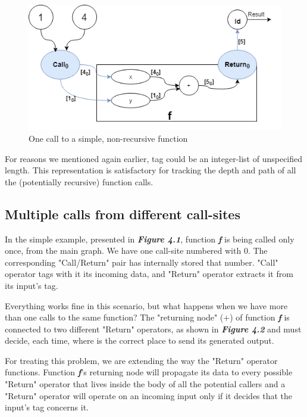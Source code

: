 \documentclass[ack,preface]{dithesis}
\begin{document}
\begin{figure}
\centering
\includegraphics[scale=0.65]{figures/Example1}
\caption{One call to a simple, non-recursive function}
\end{figure}

For reasons we mentioned again earlier, tag could be an integer-list of unspecified length. This representation is satisfactory for tracking the depth and path of all the (potentially recursive) function calls.

\subsection{Multiple calls from different call-sites}
In the simple example, presented in \textit{\textbf{Figure 4.1}}, function \textit{\textbf{f}} is being called only once, from the main graph. We have one call-site numbered with 0. The corresponding "Call/Return" pair has internally stored that number. "Call" operator tags with it its incoming data, and "Return" operator extracts it from its input's tag. 

Everything works fine in this scenario, but what happens when we have more than one calls to the same function? 
The "returning node" (+) of function  \textit{\textbf{f}} is connected to  two different "Return" operators, as shown in \textit{\textbf{Figure 4.2}} and must decide, each time,  where is the correct place to send its generated output.

For treating this problem, we are extending the way the "Return" operator functions.  Function \textit{\textbf{f}}'s returning node will  propagate its data to every possible "Return" operator that lives inside the body of all the potential callers and a "Return" operator will operate on an incoming input only if it decides that the input's tag concerns it.
\end{document}
